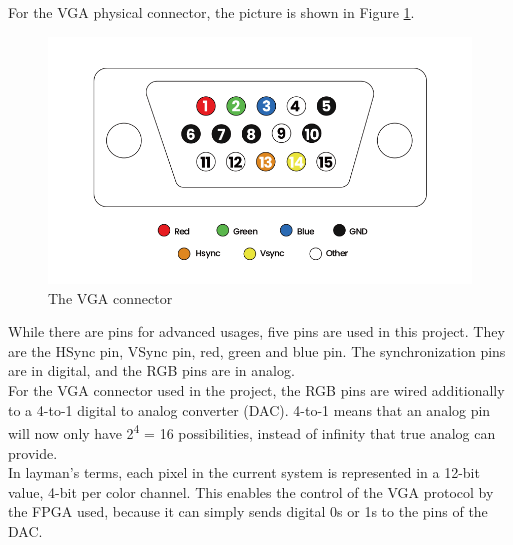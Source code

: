 \documentclass{article}
\begin{document}
		For the VGA physical connector, the picture is shown in Figure \ref{fig:vgacon}.
	\begin{figure}[h]
		\centering
		\includegraphics[scale=0.31]{vgacon}
		\caption{The VGA connector}
		\label{fig:vgacon}
	\end{figure}While there are pins for advanced usages, five pins are used in this project. They are the HSync pin, VSync pin, red, green and blue pin. The synchronization pins are in digital, and the RGB pins are in analog.
	\\
		
		For the VGA connector used in the project, the RGB pins are wired additionally to a 4-to-1 digital to analog converter (DAC). 4-to-1 means that an analog pin will now only have 2\textsuperscript{4} = 16 possibilities, instead of infinity that true analog can provide.
	\\
		
		In layman's terms, each pixel in the current system is represented in a 12-bit value, 4-bit per color channel. This enables the control of the VGA protocol by the FPGA used, because it can simply sends digital 0s or 1s to the pins of the DAC.
		
\end{document}
